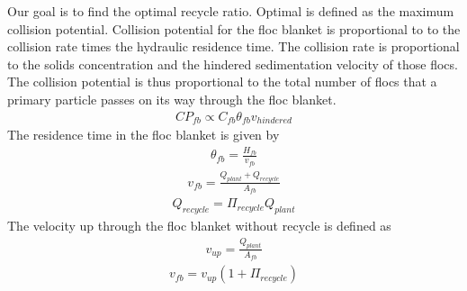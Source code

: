 \documentclass[letterpaper,10pt,english]{sphinxmanual}
\begin{document}
{Our goal is to find the optimal recycle ratio. Optimal is defined as the maximum collision potential. Collision potential for the floc blanket is proportional to to the collision rate times the hydraulic residence time. The collision rate is proportional to the solids concentration and the hindered sedimentation velocity of those flocs. The collision potential is thus proportional to the total number of flocs that a primary particle passes on its way through the floc blanket.
\begin{equation}\label{equation:Sedimentation/Sed_Theory_and_Future_Work:Sedimentation/Sed_Theory_and_Future_Work:0}
\begin{split}CP_{fb} \propto C_{fb} \theta_{fb} v_{hindered}\end{split}
\end{equation}
The residence time in the floc blanket is given by
\begin{equation}\label{equation:Sedimentation/Sed_Theory_and_Future_Work:Sedimentation/Sed_Theory_and_Future_Work:1}
\begin{split}\theta_{fb} = \frac{H_{fb}}{v_{fb}}\end{split}
\end{equation}\begin{equation}\label{equation:Sedimentation/Sed_Theory_and_Future_Work:Sedimentation/Sed_Theory_and_Future_Work:2}
\begin{split}v_{fb} = \frac{Q_{plant} + Q_{recycle}}{A_{fb}}\end{split}
\end{equation}\begin{equation}\label{equation:Sedimentation/Sed_Theory_and_Future_Work:Sedimentation/Sed_Theory_and_Future_Work:3}
\begin{split}Q_{recycle} = \Pi_{recycle}Q_{plant}\end{split}
\end{equation}
The velocity up through the floc blanket without recycle is defined as
\begin{equation}\label{equation:Sedimentation/Sed_Theory_and_Future_Work:Sedimentation/Sed_Theory_and_Future_Work:4}
\begin{split}v_{up} = \frac{Q_{plant}}{A_{fb}}\end{split}
\end{equation}\begin{equation}\label{equation:Sedimentation/Sed_Theory_and_Future_Work:Sedimentation/Sed_Theory_and_Future_Work:5}
\begin{split}v_{fb} = v_{up}\left( 1 + \Pi_{recycle} \right)\end{split}

\end{equation}}
\end{document}
